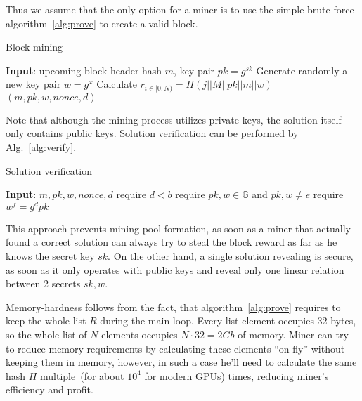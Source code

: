 Thus we assume that the only option for a miner is to use the simple brute-force algorithm~\ref{alg:prove} to
create a valid block.

\begin{algorithm}[H]
    \caption{Block mining}
    \label{alg:prove}
    \begin{algorithmic}[1]
        \State \textbf{Input}: upcoming block header hash $m$, key pair $pk=g^{sk}$
        \State Generate randomly a new key pair $w=g^x$
        \State Calculate $r_{i \in [0,N)}=H(j||M||pk||m||w)$
        \State \Return $(m,pk,w,nonce,d)$
        \EndIf
        \EndWhile
    \end{algorithmic}
\end{algorithm}

Note that although the mining process utilizes private keys, the solution itself
only contains public keys. Solution verification can be performed by Alg.~\ref{alg:verify}.

\begin{algorithm}[H]
    \caption{Solution verification}
    \label{alg:verify}
    \begin{algorithmic}[1]
        \State \textbf{Input}: $m,pk,w,nonce,d$
        \State require $d < b$
        \State require $pk,w\in \mathbb{G}$ and $pk,w \ne e$
        \State require $w^f = g^dpk$
    \end{algorithmic}
\end{algorithm}

This approach prevents mining pool formation, as soon as a miner that actually found a correct solution
can always try to steal the block reward as far as he knows the secret key $sk$. On the other hand,
a single solution revealing is secure, as soon as it only operates with public keys and reveal only one
linear relation between 2 secrets $sk,w$.

Memory-hardness follows from the fact, that algorithm~\ref{alg:prove} requires to keep
the whole list $R$ during the main loop.
Every list element occupies 32 bytes, so the whole list of $N$ elements
occupies $N \cdot 32 = 2 Gb$ of memory.
Miner can try to reduce memory requirements by calculating these elements ``on fly''
without keeping them in memory, however, in such a case he'll need to calculate the same
hash $H$ multiple~(for about $10^4$ for modern GPUs) times, reducing miner's efficiency and profit.

